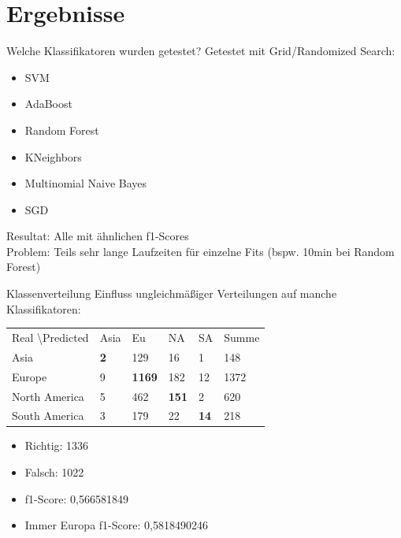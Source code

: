 \documentclass[12pt]{beamer}
\begin{document}
\section{Ergebnisse}
\begin{frame}[fragile]{Welche Klassifikatoren wurden getestet?}
Getestet mit Grid/Randomized Search:
\begin{itemize}
\item SVM 
\item AdaBoost
\item Random Forest
\item KNeighbors
\item Multinomial Naive Bayes
\item SGD
\end{itemize}

Resultat: Alle mit ähnlichen f1-Scores \\
Problem: Teils sehr lange Laufzeiten für einzelne Fits (bspw. 10min bei Random Forest)
\end{frame}

\begin{frame}[fragile]{Klassenverteilung}
Einfluss ungleichmäßiger Verteilungen auf manche Klassifikatoren: \\
\begin{tabular}{|l|l|l|l|l|l|}
\hline
Real \textbackslash Predicted & Asia & Eu & NA & SA & Summe\\
Asia & \textbf{2} & 129 & 16 & 1 & 148 \\
Europe & 9 & \textbf{1169} & 182 & 12 & 1372 \\
North America & 5 & 462 & \textbf{151} &2 & 620 \\
South America & 3 & 179 & 22 & \textbf{14} & 218 \\
\hline
\end{tabular}
\begin{itemize}
\item Richtig: 1336
\item Falsch: 1022
\item f1-Score: 0,566581849
\item Immer Europa f1-Score: 0,5818490246
\end{itemize}				

\end{frame}
\end{document}
